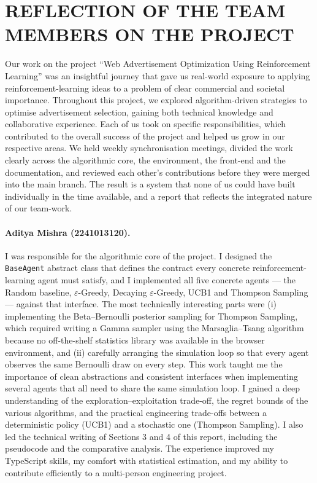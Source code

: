 \section{REFLECTION OF THE TEAM MEMBERS ON THE PROJECT}

Our work on the project ``Web Advertisement Optimization Using Reinforcement Learning'' was an insightful journey that gave us real-world exposure to applying reinforcement-learning ideas to a problem of clear commercial and societal importance. Throughout this project, we explored algorithm-driven strategies to optimise advertisement selection, gaining both technical knowledge and collaborative experience. Each of us took on specific responsibilities, which contributed to the overall success of the project and helped us grow in our respective areas. We held weekly synchronisation meetings, divided the work clearly across the algorithmic core, the environment, the front-end and the documentation, and reviewed each other's contributions before they were merged into the main branch. The result is a system that none of us could have built individually in the time available, and a report that reflects the integrated nature of our team-work.

\paragraph{Aditya Mishra (2241013120).}
I was responsible for the algorithmic core of the project. I designed the \texttt{BaseAgent} abstract class that defines the contract every concrete reinforcement-learning agent must satisfy, and I implemented all five concrete agents --- the Random baseline, $\varepsilon$-Greedy, Decaying $\varepsilon$-Greedy, UCB1 and Thompson Sampling --- against that interface. The most technically interesting parts were (i) implementing the Beta--Bernoulli posterior sampling for Thompson Sampling, which required writing a Gamma sampler using the Marsaglia--Tsang algorithm because no off-the-shelf statistics library was available in the browser environment, and (ii) carefully arranging the simulation loop so that every agent observes the same Bernoulli draw on every step. This work taught me the importance of clean abstractions and consistent interfaces when implementing several agents that all need to share the same simulation loop. I gained a deep understanding of the exploration--exploitation trade-off, the regret bounds of the various algorithms, and the practical engineering trade-offs between a deterministic policy (UCB1) and a stochastic one (Thompson Sampling). I also led the technical writing of Sections 3 and 4 of this report, including the pseudocode and the comparative analysis. The experience improved my TypeScript skills, my comfort with statistical estimation, and my ability to contribute efficiently to a multi-person engineering project.

